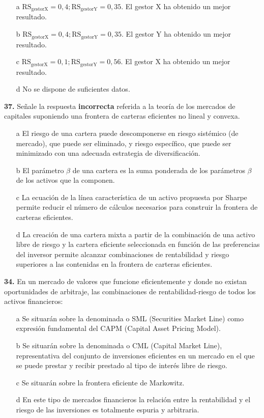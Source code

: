 \documentclass{nuevotema}
\begin{document}
\begin{enumerate}
	\item[a] $\text{RS}_{\text{gestorX}} = 0,4; \text{RS}_{\text{gestorY}} = 0,35$. El gestor X ha obtenido un mejor resultado.
	\item[b] $\text{RS}_{\text{gestorX}} = 0,4; \text{RS}_{\text{gestorY}} = 0,35$. El gestor Y ha obtenido un mejor resultado.
	\item[c] $\text{RS}_{\text{gestorX}} = 0,1; \text{RS}_{\text{gestorY}} = 0,56$. El gestor X ha obtenido un mejor resultado.
	\item[d] No se dispone de suficientes datos.
\end{enumerate}

\textbf{37.} Señale la respuesta \textbf{incorrecta} referida a la teoría de los mercados de capitales suponiendo una frontera de carteras eficientes no lineal y convexa.
\begin{enumerate}
	\item[a] El riesgo de una cartera puede descomponerse en riesgo sistémico (de mercado), que puede ser eliminado, y riesgo específico, que puede ser minimizado con una adecuada estrategia de diversificación.
	\item[b] El parámetro $\beta$ de una cartera es la suma ponderada de los parámetros $\beta$ de los activos que la componen.
	\item[c] La ecuación de la línea característica de un activo propuesta por Sharpe permite reducir el número de cálculos necesarios para construir la frontera de carteras eficientes.
	\item[d] La creación de una cartera mixta a partir de la combinación de una activo libre de riesgo y la cartera eficiente seleccionada en función de las preferencias del inversor permite alcanzar combinaciones de rentabilidad y riesgo superiores a las contenidas en la frontera de carteras eficientes.
\end{enumerate}

\textbf{34.} En un mercado de valores que funcione eficientemente y donde no existan oportunidades de arbitraje, las combinaciones de rentabilidad-riesgo de todos los activos financieros:
\begin{enumerate}
	\item[a] Se situarán sobre la denominada  o SML (Securities Market Line) como expresión fundamental del CAPM (Capital Asset Pricing Model).
	\item[b] Se situarán sobre la denominada  o CML (Capital Market Line), representativa del conjunto de inversiones eficientes en un mercado en el que se puede prestar y recibir prestado al tipo de interés libre de riesgo.
	\item[c] Se situarán sobre la frontera eficiente de Markowitz.
	\item[d] En este tipo de mercados financieros la relación entre la rentabilidad y el riesgo de las inversiones es totalmente espuria y arbitraria.
\end{enumerate}
\end{document}
